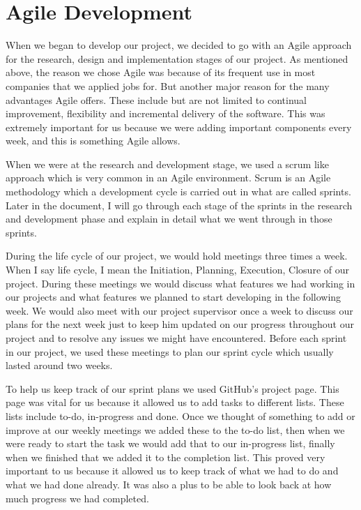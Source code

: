 \section{Agile Development}
When we began to develop our project, we decided to go with an Agile approach for the research, design and implementation stages of our project. As mentioned above, the reason we chose Agile was because of its frequent use in most companies that we applied jobs for. But another major reason for the many advantages Agile offers. These include but are not limited to continual improvement, flexibility and incremental delivery of the software. This was extremely important for us because we were adding important components every week, and this is something Agile allows.
\par
When we were at the research and development stage, we used a scrum like approach which is very common in an Agile environment. Scrum is an Agile methodology which a development cycle is carried out in what are called sprints. Later in the document, I will go through each stage of the sprints in the research and development phase and explain in detail what we went through in those sprints.
\par
During the life cycle of our project, we would hold meetings three times a week. When I say life cycle, I mean the Initiation, Planning, Execution, Closure of our project. During these meetings we would discuss what features we had working in our projects and what features we planned to start developing in the following week. We would also meet with our project supervisor once a week to discuss our plans for the next week just to keep him updated on our progress throughout our project and to resolve any issues we might have encountered. Before each sprint in our project, we used these meetings to plan our sprint cycle which usually lasted around two weeks. 
\par
To help us keep track of our sprint plans we used GitHub’s project page. This page was vital for us because it allowed us to add tasks to different lists. These lists include to-do, in-progress and done. Once we thought of something to add or improve at our weekly meetings we added these to the to-do list, then when we were ready to start the task we would add that to our in-progress list, finally when we finished that we added it to the completion list. This proved very important to us because it allowed us to keep track of what we had to do and what we had done already. It was also a plus to be able to look back at how much progress we had completed.
